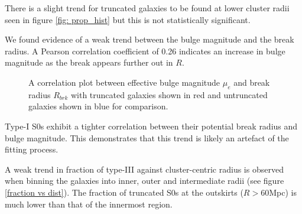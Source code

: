 There is a slight trend for truncated galaxies to be found at lower cluster radii seen in figure \ref{fig: prop_hist} but this is not statistically significant.

We found evidence of a weak trend between the bulge magnitude and the break radius. A Pearson correlation coefficient of 0.26 indicates an increase in bulge magnitude as the break appears further out in $R$.
\begin{figure}[ht]
	\centering
	\label{bulge/break correlation}
	\caption{\footnotesize{A correlation plot between effective bulge magnitude $\mu_e$ and break radius $R_{brk}$ with truncated galaxies shown in red and untruncated galaxies shown in blue for comparison.}}
\end{figure}
Type-I S0s exhibit a tighter correlation between their potential break radius and bulge magnitude. This demonstrates that this trend is likely an artefact of the fitting process.

A weak trend in fraction of type-III against cluster-centric radius is observed when binning the galaxies into inner, outer and intermediate radii (see figure \ref{fraction vs dist}). The fraction of truncated S0s at the outskirts ($R > 60 $Mpc) is much lower than that of the innermost region.

